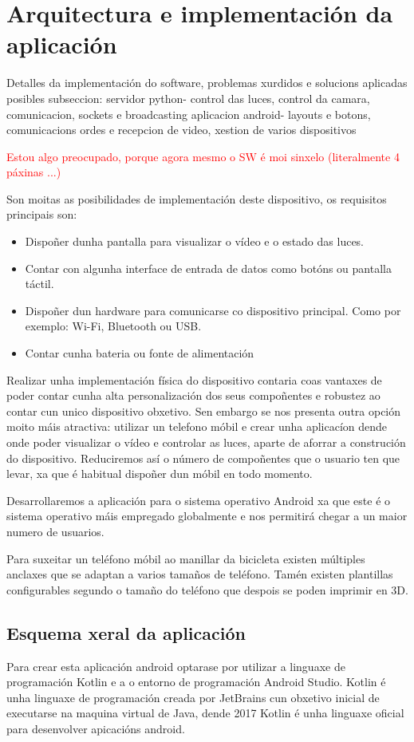 \chapter{Arquitectura e implementación da aplicación}
\label{chap:implementacion_aplicacion}
Detalles da implementación do software, problemas xurdidos e solucions aplicadas
posibles subseccion:
servidor python- control das luces, control da camara, comunicacion, sockets e broadcasting
aplicacion android- layouts e botons, comunicacions ordes e recepcion de video, xestion de varios dispositivos


\textcolor{red}{Estou algo preocupado, porque agora mesmo o SW é moi sinxelo (literalmente 4 páxinas ...)}


Son moitas as posibilidades de implementación deste dispositivo, os requisitos principais son:
\begin{itemize}
    \item Dispoñer dunha pantalla para visualizar o vídeo e o estado das luces.
    \item Contar con algunha interface de entrada de datos como botóns ou pantalla táctil.
    \item Dispoñer dun hardware para comunicarse co dispositivo principal. Como por exemplo: Wi-Fi, Bluetooth ou USB.
    \item Contar cunha bateria ou fonte de alimentación
\end{itemize}

Realizar unha implementación física do dispositivo contaria coas vantaxes de poder contar cunha alta personalización dos seus compoñentes e robustez ao contar cun unico dispositivo obxetivo. Sen embargo se nos presenta outra opción moito máis atractiva: utilizar un telefono móbil e crear unha aplicacíon dende onde poder visualizar o vídeo e controlar as luces, aparte de aforrar a construción do dispositivo. Reduciremos así o número de compoñentes que o usuario ten que levar, xa que é habitual dispoñer dun móbil en todo momento.

Desarrollaremos a aplicación para o sistema operativo Android xa que este é o sistema operativo máis empregado globalmente e nos permitirá chegar a un maior numero de usuarios.

Para suxeitar un teléfono móbil ao manillar da bicicleta existen múltiples anclaxes que se adaptan a varios tamaños de teléfono. Tamén existen plantillas configurables segundo o tamaño do teléfono que despois se poden imprimir en 3D.

\section{Esquema xeral da aplicación}
Para crear esta aplicación android optarase por utilizar a linguaxe de programación Kotlin e a o entorno de programación Android Studio. Kotlin é unha linguaxe de programación creada por JetBrains cun obxetivo inicial de executarse na maquina virtual de Java, dende 2017 Kotlin é unha linguaxe oficial para desenvolver apicacións android.

